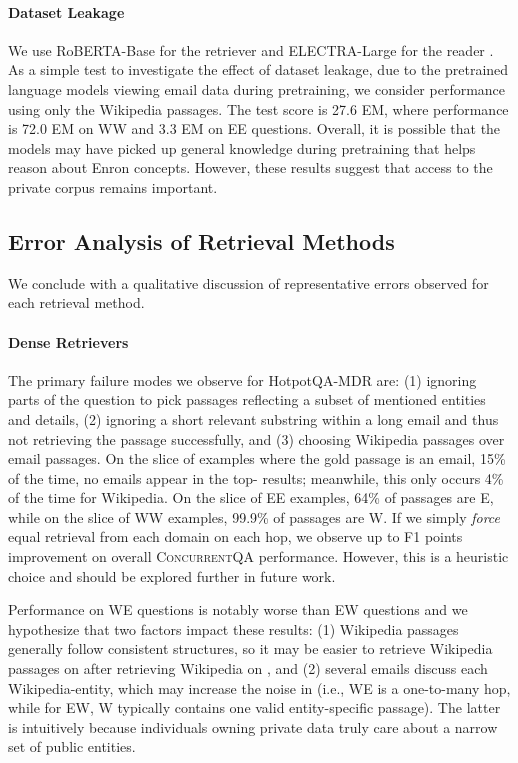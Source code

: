 \documentclass{article}
\renewcommand\cite{\citep}	\newcommand\shortcite{\citeyearpar}\newcommand\newcite{\citet}
\newcommand{\datasetname}{\textsc{ConcurrentQA}\xspace}
\begin{document}
\paragraph{Dataset Leakage} 
We use RoBERTA-Base for the retriever \cite{liu2019roberta}
and ELECTRA-Large for the reader
\cite{clark2020electra}. As a simple test to investigate the effect of dataset leakage, due to the pretrained language models viewing email data during pretraining, we consider performance using only the Wikipedia passages. The test score is 27.6 EM, where performance is 72.0 EM on WW and 3.3 EM on EE questions. Overall, it is possible that the models may have picked up general knowledge during pretraining that helps reason about Enron concepts. However, these results suggest that access to the private corpus remains important. 



\subsection{Error Analysis of Retrieval Methods} 
We conclude with a qualitative discussion of representative errors observed for each retrieval method. 
\paragraph{Dense Retrievers} The primary failure modes we observe for HotpotQA-MDR are: (1) ignoring parts of the question to pick passages reflecting a subset of mentioned entities and details, 
(2) ignoring a short relevant substring within a long  email and thus not retrieving the  passage successfully,
and (3) choosing Wikipedia passages over email passages. On the slice of examples where the gold  passage is an email, 15\% of the time, no emails appear in the top-  results; meanwhile, this only occurs 4\% of the time for  Wikipedia. On the slice of EE examples, 64\% of  passages are E, while on the slice of WW examples, 99.9\% of  passages are W. If we simply \textit{force} equal retrieval from each domain on each hop, we observe up to  F1 points improvement on overall \datasetname performance. However, this is a heuristic choice and should be explored further in future work.

Performance on WE questions is notably worse than EW questions and we hypothesize that two factors impact these results: (1) Wikipedia passages generally follow consistent structures,
so it may be easier to retrieve Wikipedia passages on  after retrieving Wikipedia on , and (2) several emails discuss each Wikipedia-entity, which may increase the noise in  (i.e., WE is a one-to-many hop, while for EW, W typically contains one valid entity-specific passage). The latter is intuitively because individuals owning private data truly care about a narrow set of public entities.
\end{document}
